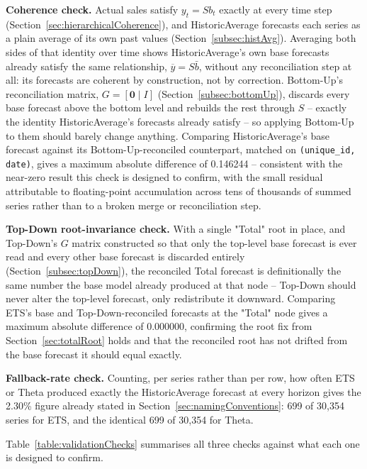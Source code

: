 \textbf{Coherence check.} Actual sales satisfy $y_t = S b_t$ exactly at every time step (Section~\ref{sec:hierarchicalCoherence}), and HistoricAverage forecasts each series as a plain average of its own past values (Section~\ref{subsec:histAvg}). Averaging both sides of that identity over time shows HistoricAverage's own base forecasts already satisfy the same relationship, $\overline{y} = S\bar{b}$, without any reconciliation step at all: its forecasts are coherent by construction, not by correction. Bottom-Up's reconciliation matrix, $G = [\mathbf{0} \mid I]$ (Section~\ref{subsec:bottomUp}), discards every base forecast above the bottom level and rebuilds the rest through $S$ -- exactly the identity HistoricAverage's forecasts already satisfy -- so applying Bottom-Up to them should barely change anything. Comparing HistoricAverage's base forecast against its Bottom-Up-reconciled counterpart, matched on \texttt{(unique\_id, date)}, gives a maximum absolute difference of 0.146244 -- consistent with the near-zero result this check is designed to confirm, with the small residual attributable to floating-point accumulation across tens of thousands of summed series rather than to a broken merge or reconciliation step.

\textbf{Top-Down root-invariance check.} With a single "Total" root in place, and Top-Down's $G$ matrix constructed so that only the top-level base forecast is ever read and every other base forecast is discarded entirely (Section~\ref{subsec:topDown}), the reconciled Total forecast is definitionally the same number the base model already produced at that node -- Top-Down should never alter the top-level forecast, only redistribute it downward. Comparing ETS's base and Top-Down-reconciled forecasts at the "Total" node gives a maximum absolute difference of 0.000000, confirming the root fix from Section~\ref{sec:totalRoot} holds and that the reconciled root has not drifted from the base forecast it should equal exactly.

\textbf{Fallback-rate check.} Counting, per series rather than per row, how often ETS or Theta produced exactly the HistoricAverage forecast at every horizon gives the 2.30\% figure already stated in Section~\ref{sec:namingConventions}: 699 of 30,354 series for ETS, and the identical 699 of 30,354 for Theta.

Table~\ref{table:validationChecks} summarises all three checks against what each one is designed to confirm.

